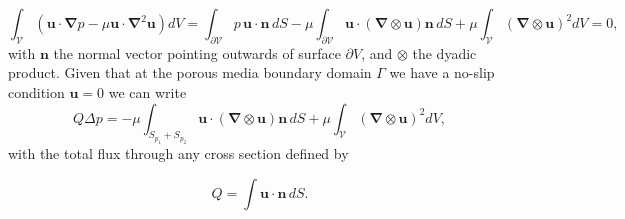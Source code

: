 \documentclass[draft]{agujournal2019}
\providecommand{\DIFdelbegin}{} %
\providecommand{\DIFdelend}{} %
\begin{document}
\DIFdelend \begin{equation}
\int_{\mathcal{V}} \left(\mathbf{u}\cdot\mathbf{\nabla} p-\mu \mathbf{u}\cdot\mathbf{\nabla}^2 \mathbf{u}\right) dV 
= \int_{\partial \mathcal{V}}  p\,\mathbf{u}\cdot\mathbf{n}\,dS-\mu \int_{\partial \mathcal{V}} \mathbf{u}\cdot (\mathbf{\nabla}\otimes \mathbf{u})\mathbf{n}\,dS+\mu \int_{\mathcal{V}} (\mathbf{\nabla}\otimes\mathbf{u})^2 dV=0, \label{eq:stokes_dissipation}
\end{equation}
with $\mathbf{n}$ the normal vector pointing outwards of surface $\partial V$, and $\otimes$ the dyadic product. Given that at the porous media boundary domain $\Gamma$ we have a no-slip condition $\mathbf{u}=0$ we can write 
\begin{equation}
	Q \Delta p = -\mu\int_{S_{p_1}+S_{p_2}} \mathbf{u}\cdot (\mathbf{\nabla}\otimes \mathbf{u})\mathbf{n}\,dS +\mu \int_{\mathcal{V}} (\mathbf{\nabla}\otimes \mathbf{u})^2 dV, \label{eq:pressuredrop}
\end{equation}
with the total flux through any cross section defined by 
\DIFdelbegin %

\DIFdelend \begin{equation}
	Q=\int \mathbf{u}\cdot\mathbf{n}\, dS.
\end{equation}
\DIFdelbegin %
\end{document}
